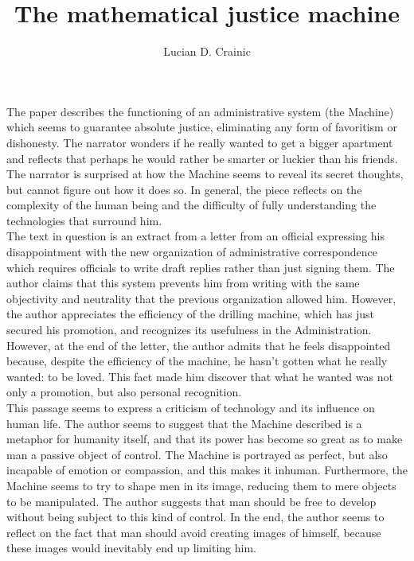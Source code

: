 \documentclass{homework}
\title{The mathematical justice machine}
\author{Lucian D. Crainic}
\begin{document}
\maketitle

The paper describes the functioning of an administrative system (the Machine) 
which seems to guarantee absolute justice, eliminating any form of favoritism or 
dishonesty. The narrator wonders if he really wanted to get a bigger apartment and 
reflects that perhaps he would rather be smarter or luckier than his friends. 
The narrator is surprised at how the Machine seems to reveal its secret thoughts,
but cannot figure out how it does so. In general, the piece reflects on the 
complexity of the human being and the difficulty of fully understanding the 
technologies that surround him. \\

The text in question is an extract from a letter from an official expressing his 
disappointment with the new organization of administrative correspondence which 
requires officials to write draft replies rather than just signing them. 
The author claims that this system prevents him from writing with the same 
objectivity and neutrality that the previous organization allowed him. 
However, the author appreciates the efficiency of the drilling machine, which 
has just secured his promotion, and recognizes its usefulness in the Administration.
However, at the end of the letter, the author admits that he feels disappointed 
because, despite the efficiency of the machine, he hasn't gotten what he really 
wanted: to be loved. This fact made him discover that what he wanted was not only
a promotion, but also personal recognition. \\

This passage seems to express a criticism of technology and its influence on human 
life. The author seems to suggest that the Machine described is a metaphor for 
humanity itself, and that its power has become so great as to make man a passive 
object of control. The Machine is portrayed as perfect, but also incapable of 
emotion or compassion, and this makes it inhuman. Furthermore, the Machine seems 
to try to shape men in its image, reducing them to mere objects to be manipulated.
The author suggests that man should be free to develop without being subject to 
this kind of control. In the end, the author seems to reflect on the fact that 
man should avoid creating images of himself, because these images would 
inevitably end up limiting him. \\
\end{document}
